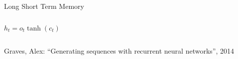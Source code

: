 \documentclass[xcolor=table]{beamer}
\begin{document}
\begin{frame}{Long Short Term Memory}
\begin{columns}[c]
	 	\begin{equation}
	 	\nonumber
			h_t = o_t \tanh(c_t)
	 	\end{equation}

	\end{columns}
	


 \vspace{0.2cm}
 {\footnotesize Graves, Alex: “Generating sequences with recurrent neural networks”, 2014}

\end{frame}
\end{document}
